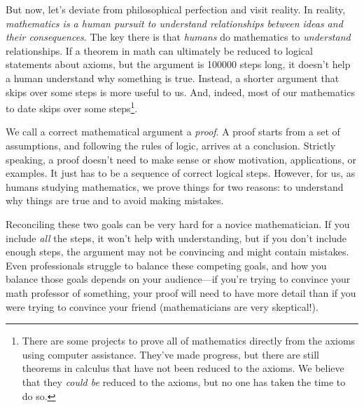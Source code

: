 	But now, let's deviate from philosophical perfection and visit reality.
	In reality, \emph{mathematics is a human pursuit to understand relationships
	between ideas and their consequences}.  The key there is that \emph{humans} do
	mathematics to \emph{understand} relationships.  If a theorem in math can
	ultimately be reduced to logical statements about axioms, but the argument is
	100000 steps long, it doesn't help a human understand why something is true.
	Instead, a shorter argument that skips over some steps is more useful to us.
	And, indeed, most of our mathematics to date skips over some steps\footnote{
		There are some projects to prove all of mathematics directly from
		the axioms using computer assistance.  They've made progress, but there
		are still theorems in calculus that have not been reduced to the
		axioms.  We believe that they \emph{could be} reduced to the axioms,
		but no one has taken the time to do so.}.

	We call a correct mathematical argument a \emph{proof}.  A proof starts
	from a set of assumptions, and following the rules of logic, arrives at a conclusion.
	Strictly speaking, a proof doesn't need to make sense or show motivation,
	applications, or examples.  It just has to be a sequence of correct logical steps.
	However, for us, as humans studying mathematics, we prove things for two reasons:
	to understand why things are true and to avoid making mistakes.

	Reconciling these two goals can be very hard for a novice mathematician.  If you include
	\emph{all} the steps, it won't help with understanding, but if you don't include enough
	steps, the argument may not be convincing and might contain mistakes.  
	Even professionals struggle to balance
	these competing goals, and how you balance those goals depends on your audience---if you're
	trying to convince your math professor of something, your proof will need to have more
	detail than if you were trying to convince your friend (mathematicians are very skeptical!).

